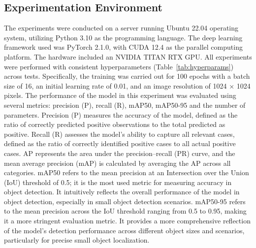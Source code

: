\documentclass[preprint,review,12pt]{elsarticle}
\begin{document}

\subsection{Experimentation Environment}
The experiments were conducted on a server running Ubuntu 22.04 operating system, utilizing Python 3.10 as the programming language. The deep learning framework used was PyTorch 2.1.0, with CUDA 12.4 as the parallel computing platform. The hardware included an NVIDIA TITAN RTX GPU. All experiments were performed with consistent hyperparameters (Table~\ref{tab:hyperparams}) across tests. Specifically, the training was carried out for 100 epochs with a batch size of 16, an initial learning rate of 0.01, and an image resolution of 1024 × 1024 pixels.
	The performance of the model in this experiment was evaluated using several metrics: precision (P), recall (R), mAP50, mAP50-95 and the number of parameters. Precision (P) measures the accuracy of the model, defined as the ratio of correctly predicted positive observations to the total predicted as positive. Recall (R) assesses the model’s ability to capture all relevant cases, defined as the ratio of correctly identified positive cases to all actual positive cases. AP represents the area under the precision–recall (PR) curve, and the mean average precision (mAP) is calculated by averaging the AP across all categories. mAP50 refers to the mean precision at an Intersection over the Union (IoU) threshold of 0.5; it is the most used metric for measuring accuracy in object detection. It intuitively reflects the overall performance of the model in object detection, especially in small object detection scenarios. mAP50-95 refers to the mean precision across the IoU threshold ranging from 0.5 to 0.95, making it a more stringent evaluation metric. It provides a more comprehensive reflection of the model’s detection performance across different object sizes and scenarios, particularly for precise small object localization.
    
\end{document}
